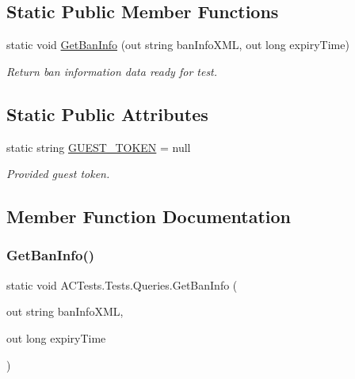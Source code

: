 \subsection*{Static Public Member Functions}
\begin{DoxyCompactItemize}
\item 
static void \mbox{\hyperlink{class_a_c_tests_1_1_tests_1_1_queries_a64ddab509ed7f6e37ad5d50e4b7d7368}{Get\+Ban\+Info}} (out string ban\+Info\+X\+ML, out long expiry\+Time)
\begin{DoxyCompactList}\small\item\em Return ban information data ready for test. \end{DoxyCompactList}\end{DoxyCompactItemize}
\subsection*{Static Public Attributes}
\begin{DoxyCompactItemize}
\item 
static string \mbox{\hyperlink{class_a_c_tests_1_1_tests_1_1_queries_a380e8f923ee219755af841d4e9008a02}{G\+U\+E\+S\+T\+\_\+\+T\+O\+K\+EN}} = null
\begin{DoxyCompactList}\small\item\em Provided guest token. \end{DoxyCompactList}\end{DoxyCompactItemize}


\subsection{Member Function Documentation}
\mbox{\label{class_a_c_tests_1_1_tests_1_1_queries_a64ddab509ed7f6e37ad5d50e4b7d7368}} 
\subsubsection{\texorpdfstring{Get\+Ban\+Info()}{GetBanInfo()}}
{\footnotesize\ttfamily static void A\+C\+Tests.\+Tests.\+Queries.\+Get\+Ban\+Info (\begin{DoxyParamCaption}\item[{out string}]{ban\+Info\+X\+ML,  }\item[{out long}]{expiry\+Time }\end{DoxyParamCaption})\hspace{0.3cm}{\ttfamily [static]}}



